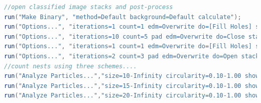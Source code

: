 \begin{enumerate}
\begin{lstlisting}[language=java, caption=Post-processing snippet., label=cd:pp]
//open classified image stacks and post-process
run("Make Binary", "method=Default background=Default calculate");
run("Options...", "iterations=1 count=1 edm=Overwrite do=[Fill Holes] stack");
run("Options...", "iterations=10 count=5 pad edm=Overwrite do=Close stack");
run("Options...", "iterations=1 count=1 edm=Overwrite do=[Fill Holes] stack");
run("Options...", "iterations=2 count=3 pad edm=Overwrite do=Open stack");
//count nests using three schemes....
run("Analyze Particles...","size=10-Infinity circularity=0.10-1.00 show=[Overlay Outlines]
run("Analyze Particles...","size=15-Infinity circularity=0.10-1.00 show=[Overlay Outlines]
run("Analyze Particles...","size=20-Infinity circularity=0.10-1.00 show=[Overlay Outlines]
\end{lstlisting}
\end{enumerate}

